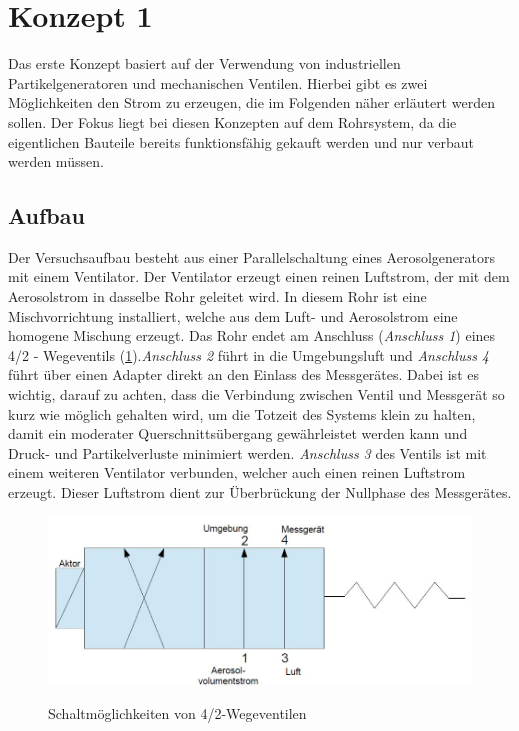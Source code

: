 \section{Konzept 1}
Das erste Konzept basiert auf der Verwendung von industriellen Partikelgeneratoren und mechanischen Ventilen. Hierbei gibt es zwei M\"{o}glichkeiten den Strom zu erzeugen, die im Folgenden n\"{a}her erl\"{a}utert werden sollen. Der Fokus liegt bei diesen Konzepten auf dem Rohrsystem, da die eigentlichen Bauteile bereits funktionsf\"{a}hig gekauft werden und nur verbaut werden m\"{u}ssen.

\subsection{Aufbau}
Der Versuchsaufbau besteht aus einer Parallelschaltung eines Aerosolgenerators mit einem Ventilator. Der Ventilator erzeugt einen reinen Luftstrom, der mit dem Aerosolstrom in dasselbe Rohr geleitet wird. In diesem Rohr ist eine Mischvorrichtung installiert, welche aus dem Luft- und Aerosolstrom eine homogene Mischung erzeugt. Das Rohr endet am Anschluss (\textit{Anschluss 1}) eines 4/2 - Wegeventils (\ref{fig:ventil}).\textit{Anschluss 2} f\"{u}hrt in die Umgebungsluft und \textit{Anschluss 4} f\"{u}hrt \"{u}ber einen Adapter direkt an den Einlass des Messger\"{a}tes. Dabei ist es wichtig, darauf zu achten, dass die Verbindung zwischen Ventil und Messger\"{a}t so kurz wie m\"{o}glich gehalten wird, um die Totzeit des Systems klein zu halten, damit ein moderater Querschnitts\"{u}bergang gew\"{a}hrleistet werden kann und Druck- und Partikelverluste minimiert werden. \textit{Anschluss 3} des Ventils ist mit einem weiteren Ventilator verbunden, welcher auch einen reinen Luftstrom erzeugt. Dieser Luftstrom dient zur \"{U}berbr\"{u}ckung der Nullphase des Messger\"{a}tes.
\begin{figure}[H]
        \myfloatalign
        {\includegraphics[width=.9\linewidth]{gfx/concepts/ventil_feder.jpg}} \quad
        \caption[Schaltm\"{o}glichkeiten von 4/2-Wegeventilen]
        {Schaltm\"{o}glichkeiten von 4/2-Wegeventilen}
        \label{fig:ventil}
\end{figure}

